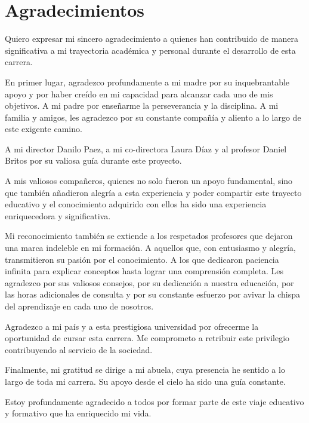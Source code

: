\chapter*{Agradecimientos}
Quiero expresar mi sincero agradecimiento a quienes han contribuido de manera significativa a mi trayectoria académica y personal durante el desarrollo de esta carrera.

En primer lugar, agradezco profundamente a mi madre por su inquebrantable apoyo y por haber creído en mi capacidad para alcanzar cada uno de mis objetivos. A mi padre por enseñarme la perseverancia y la disciplina. A mi familia y amigos, les agradezco por su constante compañía y aliento a lo largo de este exigente camino.

A mi director Danilo Paez, a mi co-directora Laura Díaz y al profesor Daniel Britos por su valiosa guía durante este proyecto.

A mis valiosos compañeros, quienes no solo fueron un apoyo fundamental, sino que también añadieron alegría a esta experiencia y poder compartir este trayecto educativo y el conocimiento adquirido con ellos ha sido una experiencia enriquecedora y significativa. 

Mi reconocimiento también se extiende a los respetados profesores que dejaron una marca indeleble en mi formación. A aquellos que, con entusiasmo y alegría, transmitieron su pasión por el conocimiento. A los que dedicaron paciencia infinita para explicar conceptos hasta lograr una comprensión completa. Les agradezco por sus valiosos consejos, por su dedicación a nuestra educación, por las horas adicionales de consulta y por su constante esfuerzo por avivar la chispa del aprendizaje en cada uno de nosotros.

Agradezco a mi país y a esta prestigiosa universidad por ofrecerme la oportunidad de cursar esta carrera. Me comprometo a retribuir este privilegio contribuyendo al servicio de la sociedad.

Finalmente, mi gratitud se dirige a mi abuela, cuya presencia he sentido a lo largo de toda mi carrera. Su apoyo desde el cielo ha sido una guía constante.

Estoy profundamente agradecido a todos por formar parte de este viaje educativo y formativo que ha enriquecido mi vida.